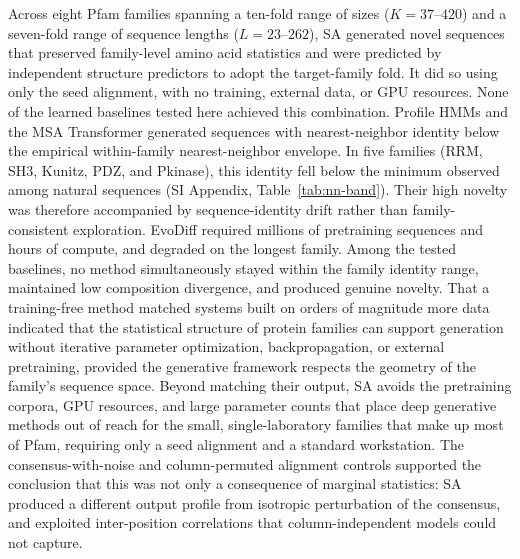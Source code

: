 
Across eight Pfam families spanning a ten-fold range of sizes ($K{=}37$--$420$) and a seven-fold range of sequence lengths ($L{=}23$--$262$), SA generated novel sequences that preserved family-level amino acid statistics and were predicted by independent structure predictors to adopt the target-family fold. It did so using only the seed alignment, with no training, external data, or GPU resources. None of the learned baselines tested here achieved this combination. Profile HMMs and the MSA Transformer generated sequences with nearest-neighbor identity below the empirical within-family nearest-neighbor envelope. In five families (RRM, SH3, Kunitz, PDZ, and Pkinase), this identity fell below the minimum observed among natural sequences (SI Appendix, Table~\ref{tab:nn-band}). Their high novelty was therefore accompanied by sequence-identity drift rather than family-consistent exploration. EvoDiff required millions of pretraining sequences and hours of compute, and degraded on the longest family. Among the tested baselines, no method simultaneously stayed within the family identity range, maintained low composition divergence, and produced genuine novelty. That a training-free method matched systems built on orders of magnitude more data indicated that the statistical structure of protein families can support generation without iterative parameter optimization, backpropagation, or external pretraining, provided the generative framework respects the geometry of the family's sequence space. Beyond matching their output, SA avoids the pretraining corpora, GPU resources, and large parameter counts that place deep generative methods out of reach for the small, single-laboratory families that make up most of Pfam, requiring only a seed alignment and a standard workstation. The consensus-with-noise and column-permuted alignment controls supported the conclusion that this was not only a consequence of marginal statistics: SA produced a different output profile from isotropic perturbation of the consensus, and exploited inter-position correlations that column-independent models could not capture.

